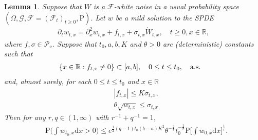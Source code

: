 \documentclass[12pt,a4paper]{amsart}
\numberwithin{equation}{section}
\theoremstyle{plain}
\newtheorem{lemma}[theorem]{Lemma}
\theoremstyle{remark}
\begin{document}
\begin{lemma} \label{thm:T.734}
	Suppose that $W$ is a $\mathcal F$-white noise in a usual probability space $(\Omega, \mathcal G, \mathcal F = (\mathcal F_t)_{t\geq 0}, \mathrm P)$. 
	Let $w$ be a mild solution to the SPDE
	\begin{align} 
	\partial_t w_{t,x} = \partial_x^2 w_{t,x} + f_{t,x} + \sigma_{t,x} \dot W_{t,x}, \quad t\geq 0, x\in \mathbb R,
	\end{align}
	where $f, \sigma\in \mathscr P_\mathrm e$. 
	Suppose that $t_0, a,b, K$ and $\theta >0$ are (deterministic) constants such that
\begin{align} \label{eq:T.41}
& \{x\in \mathbb R: f_{t,x} \neq 0\} \subset [a, b], \quad 0\leq t\leq t_0, \quad {\rm a.s.}
\end{align}
	and, almost surely, for each $0\leq t\leq t_0$ and $x\in \mathbb R$
\begin{align}
	\label{eq:T.415}&|f_{t,x}| \leq K \sigma_{t,x}, 
	\\ \label{eq:T.42}&\theta \sqrt{w_{t,x}} \leq \sigma_{t,x} 
\end{align}
	Then for any $r, q\in (1,\infty)$ with $r^{-1}+q^{-1} = 1$,
\begin{align} 
	& \mathrm P\Big(\int w_{t_0,x}\mathrm dx>0\Big) 
	\leq e^{\frac{1}{2}(q-1)t_0(b-a)K^2}\theta^{-\frac{2}{r}} t_0^{-\frac{1}{r}} \mathrm P\Big[\int w_{0,x}\mathrm dx\Big]^{\frac{1}{r}}. 
\end{align}
\end{lemma} 
\end{document}
